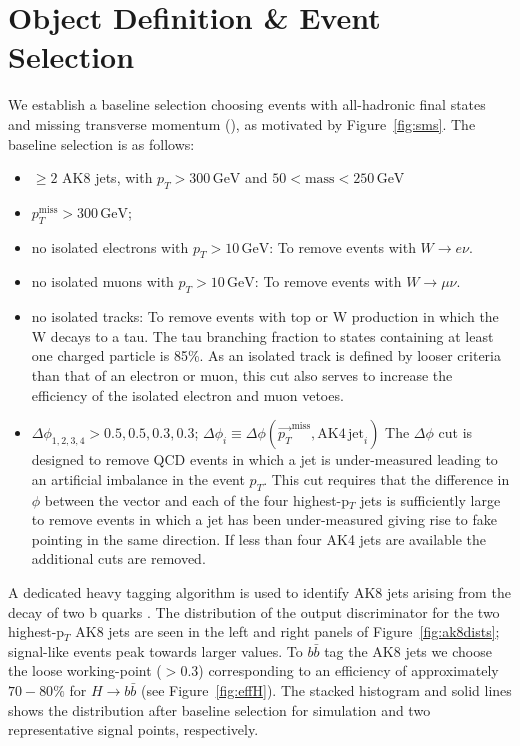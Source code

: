 \section{Object Definition \& Event Selection}

We establish a baseline selection choosing events with all-hadronic final states and missing transverse momentum (\ptmiss), as motivated by Figure~\ref{fig:sms}. The baseline selection is as follows:

\begin{itemize}
\item $\geq2$ AK8 jets, with $p_{T} > 300\,\mathrm{GeV}$ and $50 < \mathrm{mass} < 250\,\mathrm{GeV}$
\item $p_{T}^{\mathrm{miss}} > 300\,\mathrm{GeV}$;
\item no isolated electrons with $p_{T}>10\,\textrm{GeV}$:\newline
To remove events with $W \rightarrow e \nu$.
\item no isolated muons with $p_{T}>10\,\textrm{GeV}$:\newline
To remove events with $W \rightarrow \mu \nu$.
\item no isolated tracks:\newline
To remove events with top or W production in which the W decays to a tau. The tau branching fraction to states containing at least one charged particle is 85\%. As an isolated track is defined by looser criteria than that of an electron or muon, this cut also serves to increase the efficiency of the isolated electron and muon vetoes.

\item $\Delta\phi_{1, 2, 3, 4} > 0.5, 0.5, 0.3, 0.3$; $\Delta\phi_{i}\equiv \Delta\phi(\vec{p_{T}}^{\mathrm{miss}}, \mathrm{AK4\,jet}_{i})$\newline
The $\Delta\phi$ cut is designed to remove QCD events in which a jet is under-measured leading to an artificial imbalance in the event $p_{T}$. This cut requires that the difference in $\phi$ between the \ptmiss vector and each of the four highest-p$_{T}$ jets is sufficiently large to remove events in which a jet has been under-measured giving rise to fake \ptmiss pointing in the same direction. If less than four AK4 jets are available the additional cuts are removed.
\end{itemize}

A dedicated heavy tagging algorithm is used to identify AK8 jets arising from the decay of two b quarks \cite{bbtagger}. The distribution of the output discriminator for the two highest-p$_{T}$ AK8 jets are seen in the left and right panels of Figure~\ref{fig:ak8dists}; signal-like events peak towards larger values. To $b\bar{b}$ tag the AK8 jets we choose the loose working-point ($>$0.3) corresponding to an efficiency of approximately $70-80\%$ for $H \rightarrow b \bar{b}$ (see Figure~\ref{fig:effH}). The stacked histogram and solid lines shows the distribution after baseline selection for simulation and two representative signal points, respectively.


